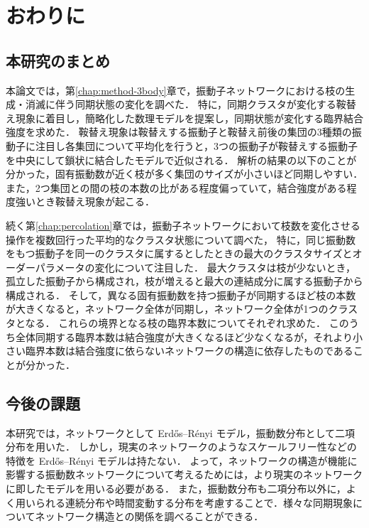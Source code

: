 \documentclass[../main]{subfiles}
\begin{document}
\chapter{おわりに}
\label{chap:summary}
\section{本研究のまとめ}
本論文では，第\ref{chap:method-3body}章で，振動子ネットワークにおける枝の生成・消滅に伴う同期状態の変化を調べた．
特に，同期クラスタが変化する鞍替え現象に着目し，簡略化した数理モデルを提案し，同期状態が変化する臨界結合強度を求めた．
鞍替え現象は鞍替えする振動子と鞍替え前後の集団の3種類の振動子に注目し各集団について平均化を行うと，3つの振動子が鞍替えする振動子を中央にして鎖状に結合したモデルで近似される．
解析の結果の以下のことが分かった，固有振動数が近く枝が多く集団のサイズが小さいほど同期しやすい．
また，2つ集団との間の枝の本数の比がある程度偏っていて，結合強度がある程度強いとき鞍替え現象が起こる．

続く第\ref{chap:percolation}章では，振動子ネットワークにおいて枝数を変化させる操作を複数回行った平均的なクラスタ状態について調べた，
特に，同じ振動数をもつ振動子を同一のクラスタに属するとしたときの最大のクラスタサイズとオーダーパラメータの変化について注目した．
最大クラスタは枝が少ないとき，孤立した振動子から構成され，枝が増えると最大の連結成分に属する振動子から構成される．
そして，異なる固有振動数を持つ振動子が同期するほど枝の本数が大きくなると，ネットワーク全体が同期し，ネットワーク全体が1つのクラスタとなる．
これらの境界となる枝の臨界本数についてそれぞれ求めた．
このうち全体同期する臨界本数は結合強度が大きくなるほど少なくなるが，それより小さい臨界本数は結合強度に依らないネットワークの構造に依存したものであることが分かった．
\section{今後の課題}
本研究では，ネットワークとして Erdős–Rényi モデル，振動数分布として二項分布を用いた．
しかし，現実のネットワークのようなスケールフリー性などの特徴を Erdős–Rényi モデルは持たない．
よって，ネットワークの構造が機能に影響する振動数ネットワークについて考えるためには，より現実のネットワークに即したモデルを用いる必要がある．
また，振動数分布も二項分布以外に，よく用いられる連続分布\cite{RevModPhys.77.137}や時間変動する分布\cite{CUMIN2007181}を考慮することで．様々な同期現象についてネットワーク構造との関係を調べることができる．
\end{document}
